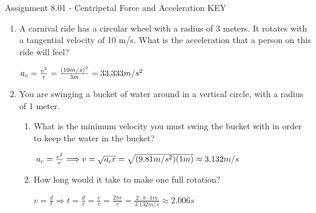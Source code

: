 \documentclass[letterpaper, 12pt]{article}
\newcommand{\assnum}{Assignment 8.01}
\newcommand{\assname}{Centripetal Force and Acceleration KEY}
\begin{document}
\fancyfoot[r]{\assnum}	


\begin{center} \assnum{} - \assname{}
\end{center}

\begin{enumerate}
	\item A carnival ride has a circular wheel with a radius of 3 meters.  It rotates with a tangential velocity of 10 m/s.  What is the acceleration that a person on this ride will feel?
		
		\color{red}
		\begin{center}
		$ a_c = \frac{v^2}{r} = \frac{(10m/s)^2}{3m} = 33.333 m/s^2
		\vspace{.15in} 			$
		\end{center}
		\color{black}
	
	\item You are swinging a bucket of water around in a vertical circle, with a radius of 1 meter.  
	\begin{enumerate}
		\item What is the minimum velocity you must swing the bucket with in order to keep the water in the bucket?
		\vspace{.25in} 	
		\color{red}
		\begin{center}
		$ a_c = \frac{v^2}{r} \Longrightarrow v = \sqrt{a_cr} = \sqrt{(9.81m/s^2)(1m)} \approx 3.132 m/s
		\vspace{.25in} 			$
		\end{center}
		\color{black}
	
	
	
		\item 	How long would it take to make one full rotation?
			\vspace{.25in} 	
			
		\color{red}
		\begin{center}
			$ v = \frac{d}{t} \Longrightarrow t = \frac{d}{v} =  \frac{c}{v} = \frac {2 \pi r} {v} = \frac {2 \cdot \pi \cdot 1 m} {3.132 m/s} \approx 2.006 s		$
		\end{center}
		\color{black}
		

\end{enumerate}
\end{enumerate}
\end{document}

